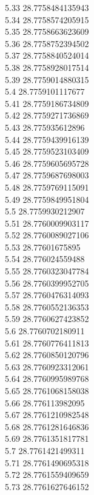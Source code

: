 {5.33	28.7758484135943\\
5.34	28.7758574205915\\
5.35	28.7758663623609\\
5.36	28.7758752394502\\
5.37	28.7758840524014\\
5.38	28.7758928017514\\
5.39	28.7759014880315\\
5.4	28.7759101117677\\
5.41	28.7759186734809\\
5.42	28.7759271736869\\
5.43	28.775935612896\\
5.44	28.7759439916139\\
5.45	28.7759523103409\\
5.46	28.7759605695728\\
5.47	28.7759687698003\\
5.48	28.7759769115091\\
5.49	28.7759849951804\\
5.5	28.7759930212907\\
5.51	28.7760009903117\\
5.52	28.7760089027106\\
5.53	28.77601675895\\
5.54	28.776024559488\\
5.55	28.7760323047784\\
5.56	28.7760399952705\\
5.57	28.7760476314093\\
5.58	28.7760552136353\\
5.59	28.7760627423852\\
5.6	28.7760702180911\\
5.61	28.7760776411813\\
5.62	28.7760850120796\\
5.63	28.7760923312061\\
5.64	28.7760995989768\\
5.65	28.7761068158038\\
5.66	28.776113982095\\
5.67	28.7761210982548\\
5.68	28.7761281646836\\
5.69	28.7761351817781\\
5.7	28.7761421499311\\
5.71	28.7761490695318\\
5.72	28.7761559409659\\
5.73	28.7761627646152\\
}
